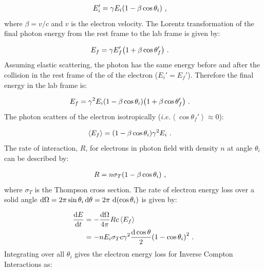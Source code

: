 \begin{equation}
    \begin{aligned}
        E_i'&=\gamma E_i\qty(1-\beta \cos\theta_i)\text{ ,}
    \end{aligned}    
\end{equation}
\noindent where $\beta = v/c$ and $v$ is the electron velocity. The Lorentz transformation of the final photon energy from the rest frame to the lab frame is given by:

\begin{equation}
	\begin{aligned}
		E_f&=\gamma E_f'\qty(1+\beta\cos\theta_f')\text{ .}
    \end{aligned}
\end{equation}
\noindent Assuming elastic scattering, the photon has the same energy before and after the collision in the rest frame of the of the electron ($E_i'=E_f'$). Therefore the final energy in the lab frame is:

\begin{equation}
    \begin{aligned}
		E_f&=\gamma^2E_i\qty(1-\beta\cos\theta_i)\qty(1+\beta\cos\theta_f')\text{ .}
	\end{aligned}
\end{equation}
\noindent The photon scatters of the electron isotropically ($i.e.\left\langle\cos\theta_f'\right\rangle\approx 0$):

\begin{equation}
    \begin{aligned}
    \left\langle E_f\right\rangle&=\qty(1-\beta\cos\theta_i)\gamma^2 E_i\text{ .}
    \end{aligned}
\end{equation}
\noindent The rate of interaction, $R$, for electrons in photon field with density $n$ at angle $\theta_i$ can be described by:

\begin{equation}
    \begin{aligned}
    R&=n\sigma_T\qty(1-\beta\cos\theta_i)\text{ ,}
    \end{aligned}
\end{equation}
\noindent where $\sigma_T$ is the Thompson cross section. The rate of electron energy loss over a solid angle $\dd{\Omega}=2\pi\sin\theta_i\dd{\theta}=2\pi\,\dd{\qty(\cos\theta_i)}$ is given by:

\begin{equation}
	\begin{split}
		\dv{E}{t}&=-\frac{\dd{\Omega}}{4\pi}Rc\left\langle E_f\right\rangle \\
		&=-nE_i\sigma_T c\gamma^2\frac{\dd{\cos\theta}}{2}\qty(1-\cos\theta_i)^2\text{ .}
	\end{split}
\end{equation}
\noindent Integrating over all $\theta_i$ gives the electron energy loss for Inverse Compton Interactions as:

